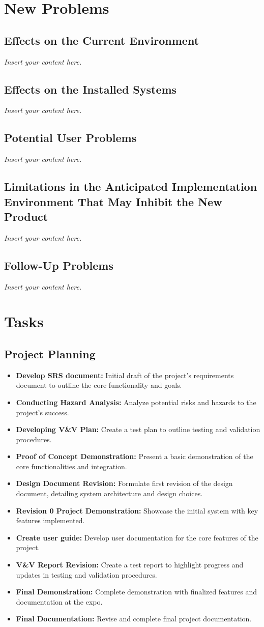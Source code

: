 \documentclass[12pt]{article}
\newcommand{\lips}{\textit{Insert your content here.}}
\begin{document}
\section{New Problems}
\subsection{Effects on the Current Environment}
\lips
\subsection{Effects on the Installed Systems}
\lips
\subsection{Potential User Problems}
\lips
\subsection{Limitations in the Anticipated Implementation Environment That May
Inhibit the New Product}
\lips
\subsection{Follow-Up Problems}
\lips

\section{Tasks}
\subsection{Project Planning}
\begin{itemize}
  \item \textbf{Develop SRS document:}  Initial draft of the project's requirements document to outline the core functionality and goals.
  \item \textbf{Conducting Hazard Analysis:} Analyze potential risks and hazards to the project’s success.

  \item \textbf{Developing V&V Plan:} Create a test plan to outline testing and validation procedures.
  \item \textbf{Proof of Concept Demonstration:} Present a basic demonstration of the core functionalities and integration.
  \item \textbf{Design Document Revision:} Formulate first revision of the design document, detailing system architecture and design choices.
  \item \textbf{Revision 0 Project Demonstration:}  Showcase the initial system with key features implemented.
  \item \textbf{Create user guide:} Develop user documentation for the core features of the project.
  \item \textbf{V&V Report Revision:} Create a test report to highlight progress and updates in testing and validation procedures.
  \item \textbf{Final Demonstration:} Complete demonstration with finalized features and documentation at the expo.
  \item \textbf{Final Documentation:} Revise and complete final project documentation.
\end{itemize}
\end{document}
